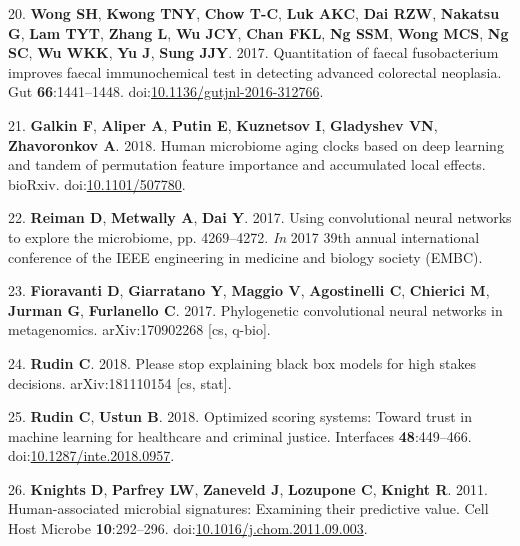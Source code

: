 \documentclass[11pt,]{article}
\begin{document}
\hypertarget{ref-wong_quantitation_2017}{}
20. \textbf{Wong SH}, \textbf{Kwong TNY}, \textbf{Chow T-C}, \textbf{Luk
AKC}, \textbf{Dai RZW}, \textbf{Nakatsu G}, \textbf{Lam TYT},
\textbf{Zhang L}, \textbf{Wu JCY}, \textbf{Chan FKL}, \textbf{Ng SSM},
\textbf{Wong MCS}, \textbf{Ng SC}, \textbf{Wu WKK}, \textbf{Yu J},
\textbf{Sung JJY}. 2017. Quantitation of faecal fusobacterium improves
faecal immunochemical test in detecting advanced colorectal neoplasia.
Gut \textbf{66}:1441--1448.
doi:\href{https://doi.org/10.1136/gutjnl-2016-312766}{10.1136/gutjnl-2016-312766}.

\hypertarget{ref-galkin_human_2018}{}
21. \textbf{Galkin F}, \textbf{Aliper A}, \textbf{Putin E},
\textbf{Kuznetsov I}, \textbf{Gladyshev VN}, \textbf{Zhavoronkov A}.
2018. Human microbiome aging clocks based on deep learning and tandem of
permutation feature importance and accumulated local effects. bioRxiv.
doi:\href{https://doi.org/10.1101/507780}{10.1101/507780}.

\hypertarget{ref-reiman_using_2017}{}
22. \textbf{Reiman D}, \textbf{Metwally A}, \textbf{Dai Y}. 2017. Using
convolutional neural networks to explore the microbiome, pp. 4269--4272.
\emph{In} 2017 39th annual international conference of the IEEE
engineering in medicine and biology society (EMBC).

\hypertarget{ref-fioravanti_phylogenetic_2017}{}
23. \textbf{Fioravanti D}, \textbf{Giarratano Y}, \textbf{Maggio V},
\textbf{Agostinelli C}, \textbf{Chierici M}, \textbf{Jurman G},
\textbf{Furlanello C}. 2017. Phylogenetic convolutional neural networks
in metagenomics. arXiv:170902268 {[}cs, q-bio{]}.

\hypertarget{ref-rudin_please_2018}{}
24. \textbf{Rudin C}. 2018. Please stop explaining black box models for
high stakes decisions. arXiv:181110154 {[}cs, stat{]}.

\hypertarget{ref-rudin_optimized_2018}{}
25. \textbf{Rudin C}, \textbf{Ustun B}. 2018. Optimized scoring systems:
Toward trust in machine learning for healthcare and criminal justice.
Interfaces \textbf{48}:449--466.
doi:\href{https://doi.org/10.1287/inte.2018.0957}{10.1287/inte.2018.0957}.

\hypertarget{ref-knights_human-associated_2011}{}
26. \textbf{Knights D}, \textbf{Parfrey LW}, \textbf{Zaneveld J},
\textbf{Lozupone C}, \textbf{Knight R}. 2011. Human-associated microbial
signatures: Examining their predictive value. Cell Host Microbe
\textbf{10}:292--296.
doi:\href{https://doi.org/10.1016/j.chom.2011.09.003}{10.1016/j.chom.2011.09.003}.
\end{document}
